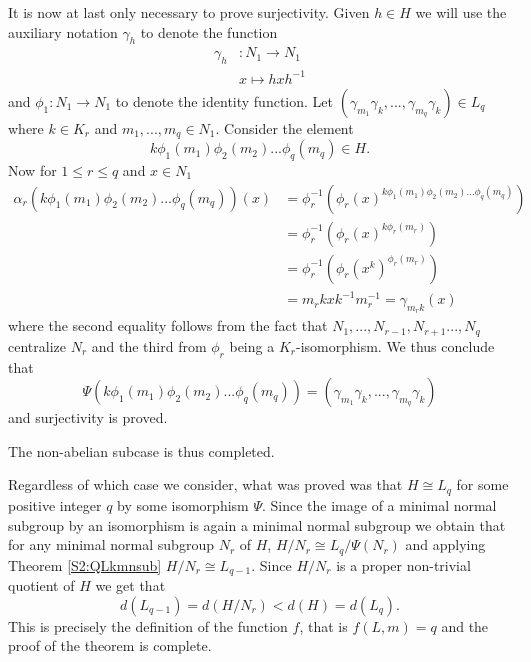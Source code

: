 It is now at last only necessary to prove surjectivity. Given $h \in H$ we will use the auxiliary notation $\gamma_h$ to denote the function
\begin{align*}
    \gamma_h &\colon N_1 \rightarrow N_1 \\
             &x \mapsto hxh^{-1}
\end{align*}
and $\phi_1 \colon N_1 \rightarrow N_1$ to denote the identity function.
Let $(\gamma_{m_1}\gamma_k,...,\gamma_{m_q}\gamma_k) \in L_q$ where $k \in K_r$ and $m_1,...,m_q \in N_1$. 
Consider the element $$k\phi_1(m_1)\phi_2(m_2)...\phi_q(m_q) \in H.$$ 
Now for $1 \le r \le q$ and $x \in N_1$
\begin{align*}
    \alpha_r(k\phi_1(m_1)\phi_2(m_2)...\phi_q(m_q))(x) &= \phi_r^{-1}(\phi_r(x)^{k\phi_1(m_1)\phi_2(m_2)...\phi_q(m_q)}) \\
    &= \phi_r^{-1}(\phi_r(x)^{k\phi_r(m_r)}) \\
    &= \phi_r^{-1}(\phi_r(x^k)^{\phi_r(m_r)}) \\
    &= m_rkxk^{-1}m_r^{-1} = \gamma_{m_rk}(x)
\end{align*}
where the second equality follows from the fact that $N_1,...,N_{r-1},N_{r+1}...,N_q$ centralize $N_r$ and the third from $\phi_r$ being a $K_r$-isomorphism. We thus conclude that
$$
\Psi(k\phi_1(m_1)\phi_2(m_2)...\phi_q(m_q)) = (\gamma_{m_1}\gamma_k,...,\gamma_{m_q}\gamma_k)
$$
and surjectivity is proved.

The non-abelian subcase is thus completed.

\vspace{2em}

Regardless of which case we consider, what was proved was that $H \cong L_q$ for some positive integer $q$ by some isomorphism $\Psi$. Since the image of a minimal normal subgroup by an isomorphism is again a minimal normal subgroup we obtain that for any minimal normal subgroup $N_r$ of $H$, $H/N_r \cong L_{q}/\Psi(N_r)$ and applying Theorem \ref{S2:QLkmnsub} $H/N_r \cong L_{q-1}$. Since $H/N_r$ is a proper non-trivial quotient of $H$ we get that
$$
d(L_{q-1}) = d(H/N_r) < d(H) = d(L_q).
$$
This is precisely the definition of the function $f$, that is $f(L,m) = q$ and the proof of the theorem is complete. 